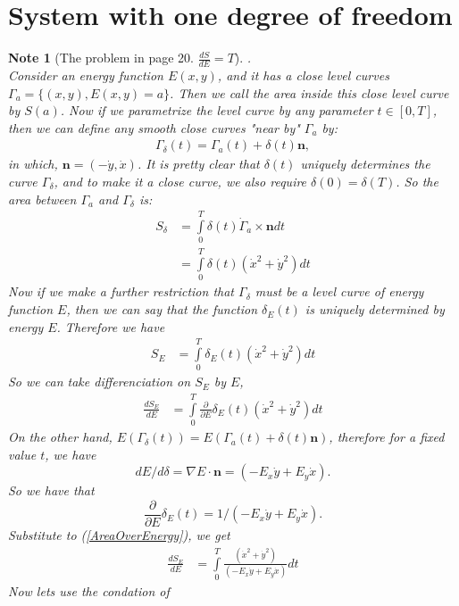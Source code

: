 \documentclass[pdf]{article}
\newcommand{\vect}[1]{\boldsymbol{#1}}
\newtheorem{note}[theorem]{Note}
\begin{document}
\section{System with one degree of freedom}
\begin{note}[The problem in page 20. $\frac{dS}{dE} = T$].\\
Consider an energy function $E(x,y)$, and it has a close level curves $\Gamma_{a} = \{(x,y), E(x,y) = a\}$. Then we call the area inside this close level curve by $S(a)$. Now if we parametrize the level curve by any parameter $t\in[0,T]$, then we can define any smooth close curves "near by" $\Gamma_a$ by:
\begin{align*}
\Gamma_\delta(t) = \Gamma_a(t) + \delta(t)\vect{n},
\end{align*}
in which, $\vect{n} = (-\dot{y}, \dot{x})$. It is pretty clear that $\delta(t)$ uniquely determines the curve $\Gamma_\delta$, and to make it a close curve, we also require $\delta(0) = \delta(T)$. So the area between $\Gamma_a$ and $\Gamma_\delta$ is:
\begin{align*}
S_\delta &= \int\limits_0^T \delta(t)\dot{\Gamma}_a\times \vect{n}dt\\
              &= \int\limits_0^T \delta(t)(\dot{x}^2 + \dot{y}^2)dt 
\end{align*}
Now if we make a further restriction that $\Gamma_\delta$ must be a level curve of energy function $E$, then we can say that the function $\delta_E(t)$ is uniquely determined by energy $E$. Therefore we have
\begin{align*}
S_E &= \int\limits_0^T \delta_E(t)(\dot{x}^2 + \dot{y}^2)dt
\end{align*}
So we can take differenciation on $S_E$ by $E$,
\begin{align}\label{AreaOverEnergy}
\frac{dS_E}{dE} &= \int\limits_0^T \frac{\partial}{\partial E}\delta_E(t)(\dot{x}^2 + \dot{y}^2)dt
\end{align}
On the other hand, $E(\Gamma_\delta(t)) = E(\Gamma_a(t) + \delta(t)\vect{n})$, therefore for a fixed value $t$, we have $$dE/d\delta = \nabla E\cdot \vect{n} = (-E_x\dot{y} + E_y\dot{x}).$$ 
So we have that $$\frac{\partial}{\partial E}\delta_E(t) = 1/(-E_x\dot{y} + E_y\dot{x}).$$
Substitute to (\ref{AreaOverEnergy}), we get
\begin{align*}
\frac{dS_E}{dE} &= \int\limits_0^T \frac{(\dot{x}^2 + \dot{y}^2)}{(-E_x\dot{y} + E_y\dot{x})}dt
\end{align*}
Now lets use the condation of 
\begin{align}\label{MotionEquation}

\end{align}
\end{note}
\end{document}
